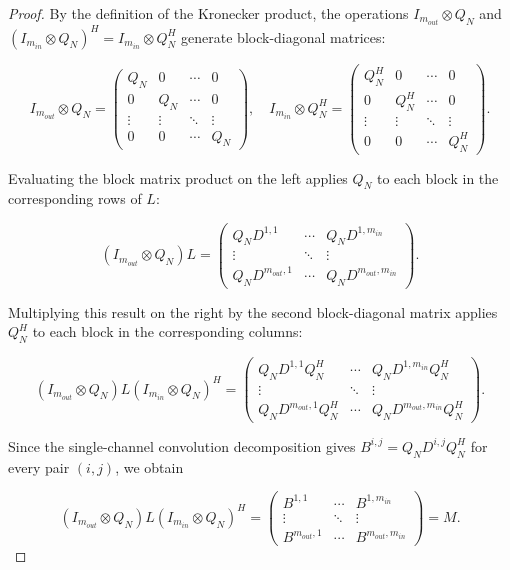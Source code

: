 \vspace{0.5cm}
\begin{proof}

By the definition of the Kronecker product, the operations
$I_{m_{out}} \otimes Q_N$ and $(I_{m_{in}} \otimes Q_N)^H = I_{m_{in}} \otimes Q_N^H$
generate block-diagonal matrices:

$$
I_{m_{out}} \otimes Q_N = 
\begin{pmatrix}
Q_N & 0 & \cdots & 0 \\
0 & Q_N & \cdots & 0 \\
\vdots & \vdots & \ddots & \vdots \\
0 & 0 & \cdots & Q_N
\end{pmatrix},
\quad
I_{m_{in}} \otimes Q_N^H = 
\begin{pmatrix}
Q_N^H & 0 & \cdots & 0 \\
0 & Q_N^H & \cdots & 0 \\
\vdots & \vdots & \ddots & \vdots \\
0 & 0 & \cdots & Q_N^H
\end{pmatrix}.
$$

Evaluating the block matrix product on the left applies $Q_N$ to each block in the
corresponding rows of $L$:

$$
(I_{m_{out}} \otimes Q_N) L = 
\begin{pmatrix}
Q_N D^{1,1} & \cdots & Q_N D^{1,m_{in}} \\
\vdots & \ddots & \vdots \\
Q_N D^{m_{out},1} & \cdots & Q_N D^{m_{out},m_{in}}
\end{pmatrix}.
$$

Multiplying this result on the right by the second block-diagonal matrix
applies $Q_N^H$ to each block in the corresponding columns:

$$
(I_{m_{out}} \otimes Q_N) L (I_{m_{in}} \otimes Q_N)^H = 
\begin{pmatrix}
Q_N D^{1,1} Q_N^H & \cdots & Q_N D^{1,m_{in}} Q_N^H \\
\vdots & \ddots & \vdots \\
Q_N D^{m_{out},1} Q_N^H & \cdots & Q_N D^{m_{out},m_{in}} Q_N^H
\end{pmatrix}.
$$

Since the single-channel convolution decomposition gives $B^{i,j} = Q_N D^{i,j} Q_N^H$ for
every pair $(i,j)$, we obtain

$$
(I_{m_{out}} \otimes Q_N) L (I_{m_{in}} \otimes Q_N)^H = 
\begin{pmatrix}
B^{1,1} & \cdots & B^{1,m_{in}} \\
\vdots & \ddots & \vdots \\
B^{m_{out},1} & \cdots & B^{m_{out},m_{in}}
\end{pmatrix}
= M.
$$
\end{proof}

